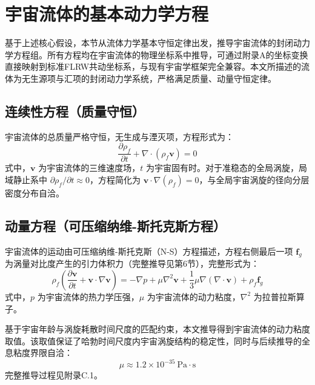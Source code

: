 \documentclass[aps,prd,preprint,superscriptaddress,floatfix,numbers,sort&compress]{revtex4-2}
\begin{document}
\section{宇宙流体的基本动力学方程}
基于上述核心假设，本节从流体力学基本守恒定律出发，推导宇宙流体的封闭动力学方程组。所有方程均在宇宙流体的物理坐标系中推导，可通过附录A的坐标变换直接映射到标准FLRW共动坐标系，与现有宇宙学框架完全兼容。本文所描述的流体为无生源项与汇项的封闭动力学系统，严格满足质量、动量守恒定律。

\subsection{连续性方程（质量守恒）}
宇宙流体的总质量严格守恒，无生成与湮灭项，方程形式为：
\begin{equation}
\frac{\partial \rho_{f}}{\partial t}+\nabla \cdot\left(\rho_{f} \boldsymbol{v}\right)=0
\label{eq:continuity}
\end{equation}
式中，$\boldsymbol{v}$ 为宇宙流体的三维速度场，$t$ 为宇宙固有时。对于准稳态的全局涡旋，局域静止系中 $\partial \rho_{f} / \partial t \approx 0$，方程简化为 $\boldsymbol{v} \cdot \nabla(\rho_{f})=0$，与全局宇宙涡旋的径向分层密度分布自洽。

\subsection{动量方程（可压缩纳维-斯托克斯方程）}
宇宙流体的运动由可压缩纳维-斯托克斯（N-S）方程描述，方程右侧最后一项 $\boldsymbol{f}_{g}$ 为涡量对比度产生的引力体积力（完整推导见第6节），完整形式为：
\begin{equation}
\rho_{f}\left(\frac{\partial \boldsymbol{v}}{\partial t}+\boldsymbol{v} \cdot \nabla \boldsymbol{v}\right)=-\nabla p+\mu \nabla^{2} \boldsymbol{v}+\frac{1}{3} \mu \nabla(\nabla \cdot \boldsymbol{v})+\rho_{f} \boldsymbol{f}_{g}
\label{eq:navier_stokes}
\end{equation}
式中，$p$ 为宇宙流体的热力学压强，$\mu$ 为宇宙流体的动力粘度，$\nabla^{2}$ 为拉普拉斯算子。

基于宇宙年龄与涡旋耗散时间尺度的匹配约束，本文推导得到宇宙流体的动力粘度取值。该取值保证了哈勃时间尺度内宇宙涡旋结构的稳定性，同时与后续推导的全息粘度界限自洽：
\begin{equation}
\mu \approx 1.2 \times 10^{-35} \ \text{Pa} \cdot \text{s}
\label{eq:viscosity}
\end{equation}
完整推导过程见附录C.1。
\end{document}

